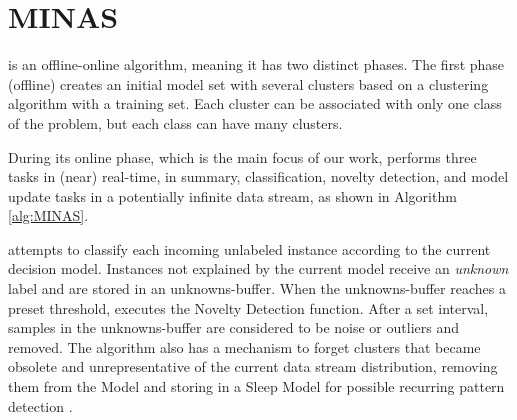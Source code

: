 \section{MINAS}
\label{sec:minas}


\minas \cite{Faria2013Minas,Faria2015minas} is an offline-online \nd algorithm,
meaning it has two distinct phases. The first phase (offline) creates an initial
model set with several clusters based on a clustering algorithm with a training
set.
Each cluster can be associated with only one class of the problem, but each
class can have many clusters.

During its online phase, which is the main focus of our work, \minas performs
three tasks in (near) real-time,
in summary,
classification, novelty detection, and model update tasks
in a potentially infinite data stream, as shown in Algorithm \ref{alg:MINAS}.

\minas attempts to classify each incoming unlabeled instance according to the
current decision model. Instances not explained by the current model
receive an \textit{unknown} label and are stored in an unknowns-buffer.
When the unknowns-buffer reaches a preset threshold, \minas executes the
Novelty Detection function.
After a set interval, samples in the unknowns-buffer are considered to be
noise or outliers and removed.
The algorithm also has a mechanism to forget clusters that became obsolete and
unrepresentative of the current data stream distribution, removing them from
the Model and storing in a Sleep Model for possible recurring pattern
detection \cite{Faria2015minas}.

